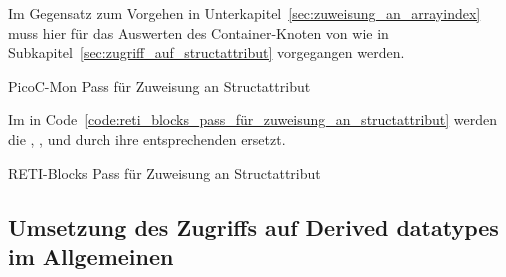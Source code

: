 Im Gegensatz zum Vorgehen in Unterkapitel~\ref{sec:zuweisung_an_arrayindex} muss hier für das Auswerten des  Container-Knoten  von  wie in Subkapitel~\ref{sec:zugriff_auf_structattribut} vorgegangen werden.

\begin{code}
  \centering
  \caption{PicoC-Mon Pass für Zuweisung an Structattribut}
  \label{code:picoc_mon_pass_für_zuweisung_an_structattribut}
\end{code}

Im  in Code~\ref{code:reti_blocks_pass_für_zuweisung_an_structattribut} werden die  , ,  und  durch ihre entsprechenden  ersetzt.

\begin{code}
  \centering
  \caption{RETI-Blocks Pass für Zuweisung an Structattribut}
  \label{code:reti_blocks_pass_für_zuweisung_an_structattribut}
\end{code}

\subsection{Umsetzung des Zugriffs auf Derived datatypes im Allgemeinen}
